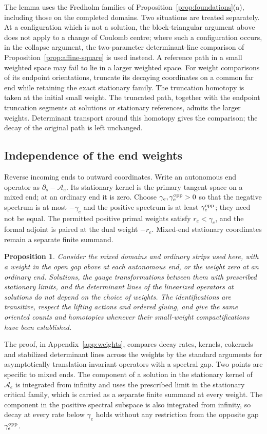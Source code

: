 \documentclass[11pt]{amsart}
\newtheorem{proposition}[theorem]{Proposition}
\theoremstyle{definition}
\theoremstyle{remark}
\theoremstyle{plain}
\numberwithin{equation}{section}
\begin{document}
The lemma uses the Fredholm families of
Proposition~\ref{prop:foundations}(a), including those on the completed
domains. Two situations are treated separately. At a configuration
which is not a solution, the block-triangular argument above does not
apply to a change of Coulomb centre; where such a configuration occurs,
in the collapse argument, the two-parameter determinant-line comparison
of Proposition~\ref{prop:affine-square} is used instead. A reference
path in a small weighted space may fail to lie in a larger weighted
space. For weight comparisons of its endpoint orientations, truncate
its decaying coordinates on a common far end while retaining the exact
stationary family. The truncation homotopy is taken at the initial
small weight. The truncated path, together with the endpoint truncation
segments at solutions or stationary references, admits the larger
weights. Determinant transport around this homotopy gives the
comparison; the decay of the original path is left unchanged.

\subsection{Independence of the end weights}
\label{subsec:weights}
Reverse incoming ends to outward coordinates. Write an autonomous
end operator as $\partial_s-\mathcal A_e$. Its stationary kernel
is the primary tangent space on a mixed end; at an ordinary end
it is zero. Choose $\gamma_e,\gamma_e^{\rm opp}>0$ so that the
negative spectrum is at most $-\gamma_e$ and the positive spectrum
is at least $\gamma_e^{\rm opp}$; they need not be equal. The
permitted positive primal weights satisfy $r_e<\gamma_e$, and the
formal adjoint is paired at the dual weight $-r_e$. Mixed-end
stationary coordinates remain a separate finite summand.

\begin{proposition}\label{prop:weights}
Consider the mixed domains and ordinary strips used here, with a
weight in the open gap above at each autonomous end, or the weight
zero at an ordinary end. Solutions, the gauge transformations between
them with prescribed stationary limits, and the determinant lines of
the linearized operators at solutions do not depend on the choice of
weights. The identifications are transitive, respect the lifting
actions and ordered gluing, and give the same oriented counts and
homotopies whenever their small-weight compactifications have been
established.
\end{proposition}
The proof, in Appendix~\ref{app:weights}, compares decay rates,
kernels, cokernels and stabilized determinant lines across the weights
by the standard arguments for asymptotically translation-invariant
operators with a spectral gap. Two points are specific to mixed ends.
The component of a solution in the stationary kernel of
$\mathcal A_e$ is integrated from infinity and uses the prescribed
limit in the stationary critical family, which is carried as a
separate finite summand at every weight. The component in
the positive spectral subspace is also integrated from infinity, so
decay at every rate below $\gamma_e$ holds without any restriction from
the opposite gap $\gamma_e^{\rm opp}$.
\end{document}

